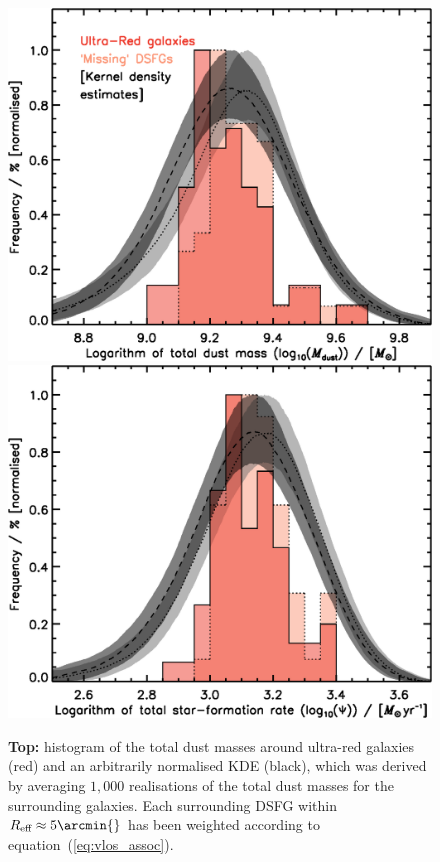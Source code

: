 \documentclass[a4paper, fleqn, usenatbib]{mnras}
\newcommand{\reff}{R_{\text{eff}}}
\begin{document}
\begin{figure}
    \centering
    \includegraphics[width=\columnwidth]{dust_masses}\\\vspace{1em}
    \includegraphics[width=\columnwidth]{star_formation_rates}
    \caption{\textbf{Top:} histogram of the total dust masses around ultra-red galaxies (red) and an arbitrarily normalised KDE (black), which was derived by averaging $1{,}000$ realisations of the total dust masses for the surrounding galaxies.
    Each surrounding DSFG within $\reff{}\approx5\arcmin{}$ has been weighted according to equation~(\ref{eq:vlos_assoc}).
}
\end{figure}
\end{document}

